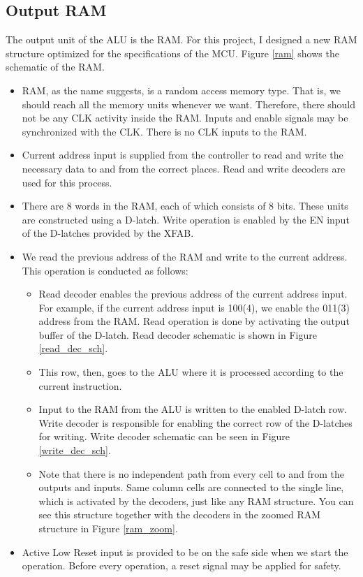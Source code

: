 \documentclass[12pt]{article}
\begin{document}
\newpage
\subsection*{Output RAM}
The output unit of the ALU is the RAM. For this project, I designed a new RAM structure optimized for the specifications of the MCU. Figure \ref{ram} shows the schematic of the RAM.

\begin{itemize}
\item RAM, as the name suggests, is a random access memory type. That is, we should reach all the memory units whenever we want. Therefore, there should not be any CLK activity inside the RAM. Inputs and enable signals may be synchronized with the CLK. There is no CLK inputs to the RAM.

\item Current address input is supplied from the controller to read and write the necessary data to and from the correct places. Read and write decoders are used for this process.

\item There are 8 words in the RAM, each of which consists of 8 bits. These units are constructed using a D-latch. Write operation is enabled by the EN input of the D-latches provided by the XFAB.

\item We read the previous address of the RAM and write to the current address. This operation is conducted as follows:

\begin{itemize}
\item Read decoder enables the previous address of the current address input. For example, if the current address input is 100(4), we enable the 011(3) address from the RAM. Read operation is done by activating the output buffer of the D-latch. Read decoder schematic is shown in Figure \ref{read_dec_sch}.
\item This row, then, goes to the ALU where it is processed according to the current instruction.
\item Input to the RAM from the ALU is written to the enabled D-latch row. Write decoder is responsible for enabling the correct row of the D-latches for writing. Write decoder schematic can be seen in Figure \ref{write_dec_sch}.
\item Note that there is no independent path from every cell to and from the outputs and inputs. Same column cells are connected to the single line, which is activated by the decoders, just like any RAM structure. You can see this structure together with the decoders in the zoomed RAM structure in Figure \ref{ram_zoom}.
\end{itemize}

\item Active Low Reset input is provided to be on the safe side when we start the operation. Before every operation, a reset signal may be applied for safety.

\end{itemize}
\end{document}
